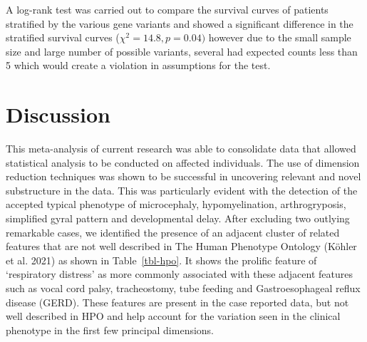 \documentclass[
  letterpaper,
  DIV=11,
  numbers=noendperiod]{scrartcl}
\begin{document}
A log-rank test was carried out to compare the survival curves of
patients stratified by the various gene variants and showed a
significant difference in the stratified survival curves
(\(\chi^2 = 14.8, p = 0.04)\) however due to the small sample size and
large number of possible variants, several had expected counts less than
5 which would create a violation in assumptions for the test.

\hypertarget{discussion}{%
\section{Discussion}\label{discussion}}

This meta-analysis of current research was able to consolidate data that
allowed statistical analysis to be conducted on affected individuals.
The use of dimension reduction techniques was shown to be successful in
uncovering relevant and novel substructure in the data. This was
particularly evident with the detection of the accepted typical
phenotype of microcephaly, hypomyelination, arthrogryposis, simplified
gyral pattern and developmental delay. After excluding two outlying
remarkable cases, we identified the presence of an adjacent cluster of
related features that are not well described in The Human Phenotype
Ontology (Köhler et al. 2021) as shown in Table~\ref{tbl-hpo}. It shows
the prolific feature of `respiratory distress' as more commonly
associated with these adjacent features such as vocal cord palsy,
tracheostomy, tube feeding and Gastroesophageal reflux disease (GERD).
These features are present in the case reported data, but not well
described in HPO and help account for the variation seen in the clinical
phenotype in the first few principal dimensions.
\end{document}
